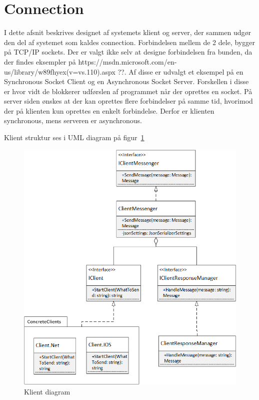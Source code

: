 \section{Connection}
I dette afsnit beskrives designet af systemets klient og server, der sammen udgør den del af systemet som kaldes connection. Forbindelsen mellem de 2 dele, bygger på TCP/IP sockets. Der er valgt ikke selv at designe forbindelsen fra bunden, da der findes eksempler på https://msdn.microsoft.com/en-us/library/w89fhyex(v=vs.110).aspx ??. Af disse er udvalgt et eksempel på en Synchronous Socket Client og en Asynchronous Socket Server. Forskellen i disse er hvor vidt de blokkerer udførslen af programmet når der oprettes en socket. På server siden ønskes at der kan oprettes flere forbindelser på samme tid, hvorimod der på klienten kun oprettes en enkelt forbindelse. Derfor er klienten synchronous, mens serveren er asynchronous.

Klient struktur ses i UML diagram på figur~\ref{fig:ConnectionClient}
\begin{figure}
	\centering
	\includegraphics[width=0.9\linewidth]{figs/connection/ConnectionClient.png}
	\caption{Klient diagram}
	\label{fig:ConnectionClient}
\end{figure}

